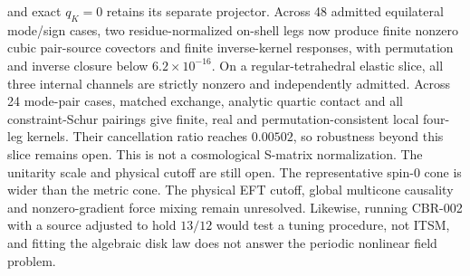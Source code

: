 and exact $q_K=0$ retains its separate projector.  Across 48 admitted
equilateral mode/sign cases, two residue-normalized on-shell legs now produce
finite nonzero cubic pair-source covectors and finite inverse-kernel
responses, with permutation and inverse closure below $6.2\times10^{-16}$.
On a regular-tetrahedral elastic slice, all three internal channels are
strictly nonzero and independently admitted.  Across 24 mode-pair cases,
matched exchange, analytic quartic contact and all constraint-Schur pairings
give finite, real and permutation-consistent local four-leg kernels.  Their
cancellation ratio reaches $0.00502$, so robustness beyond this slice remains
open.  This is not a cosmological S-matrix normalization.  The unitarity
scale and physical cutoff are still open.  The
representative spin-0 cone is wider than the metric cone.
The physical EFT cutoff, global multicone causality
and nonzero-gradient force mixing remain unresolved.
Likewise, running CBR-002 with a source adjusted to hold $13/12$ would test a
tuning procedure, not ITSM, and fitting the algebraic disk law does not answer
the periodic nonlinear field problem.
